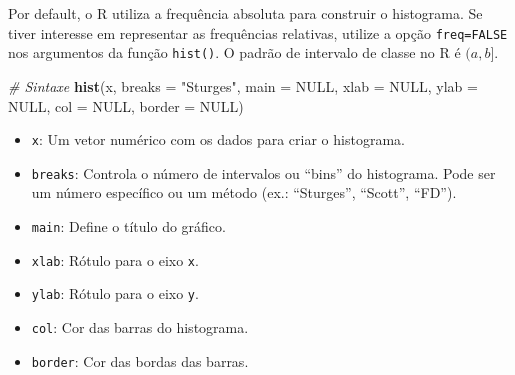 \documentclass[
]{book}
\newenvironment{Shaded}{\begin{snugshade}}{\end{snugshade}}
\newcommand{\AttributeTok}[1]{\textcolor[rgb]{0.13,0.29,0.53}{#1}}
\newcommand{\CommentTok}[1]{\textcolor[rgb]{0.56,0.35,0.01}{\textit{#1}}}
\newcommand{\ConstantTok}[1]{\textcolor[rgb]{0.56,0.35,0.01}{#1}}
\newcommand{\FunctionTok}[1]{\textcolor[rgb]{0.13,0.29,0.53}{\textbf{#1}}}
\newcommand{\NormalTok}[1]{#1}
\newcommand{\StringTok}[1]{\textcolor[rgb]{0.31,0.60,0.02}{#1}}
\providecommand{\tightlist}{%
  \setlength{\itemsep}{0pt}\setlength{\parskip}{0pt}}
\begin{document}
Por default, o R utiliza a frequência absoluta para construir o
histograma. Se tiver interesse em representar as frequências relativas,
utilize a opção \texttt{freq=FALSE} nos argumentos da função \texttt{hist()}. O padrão
de intervalo de classe no R é \((a, b]\).

\begin{Shaded}
\begin{Highlighting}[]
\CommentTok{\# Sintaxe}
\FunctionTok{hist}\NormalTok{(x, }\AttributeTok{breaks =} \StringTok{"Sturges"}\NormalTok{,}
     \AttributeTok{main =} \ConstantTok{NULL}\NormalTok{,}
     \AttributeTok{xlab =} \ConstantTok{NULL}\NormalTok{,}
     \AttributeTok{ylab =} \ConstantTok{NULL}\NormalTok{,}
     \AttributeTok{col =} \ConstantTok{NULL}\NormalTok{,}
     \AttributeTok{border =} \ConstantTok{NULL}\NormalTok{)}
\end{Highlighting}
\end{Shaded}

\begin{itemize}
\tightlist
\item
  \texttt{x}: Um vetor numérico com os dados para criar o histograma.
\item
  \texttt{breaks}: Controla o número de intervalos ou ``bins'' do histograma. Pode ser um número específico ou um método (ex.: ``Sturges'', ``Scott'', ``FD'').
\item
  \texttt{main}: Define o título do gráfico.
\item
  \texttt{xlab}: Rótulo para o eixo \texttt{x}.
\item
  \texttt{ylab}: Rótulo para o eixo \texttt{y}.
\item
  \texttt{col}: Cor das barras do histograma.
\item
  \texttt{border}: Cor das bordas das barras.
\end{itemize}
\end{document}
